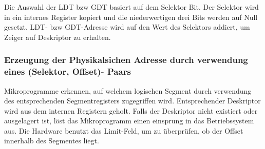 Die Auswahl der LDT bzw GDT basiert auf dem Selektor Bit. Der Selektor wird in ein internes Register kopiert und die niederwertigen drei Bits werden auf Null gesetzt. LDT- bzw GDT-Adresse wird auf den Wert des Selektors addiert, um Zeiger auf Deskriptor zu erhalten. 

\subsubsection{Erzeugung der Physikalsichen Adresse durch verwendung eines (Selektor, Offset)- Paars}

Mikroprogramme erkennen, auf welchem logischen Segment durch verwendung des entsprechenden Segmentregisters zugegriffen wird. Entsprechender Deskriptor wird aus dem internen Registern geholt. Falls der Deskriptor nicht existiert oder ausgelagert ist, löst das Mikroprogramm einen einsprung in das Betriebssystem aus. Die Hardware benutzt das Limit-Feld, um zu überprüfen, ob der Offset innerhalb des Segmentes liegt.

